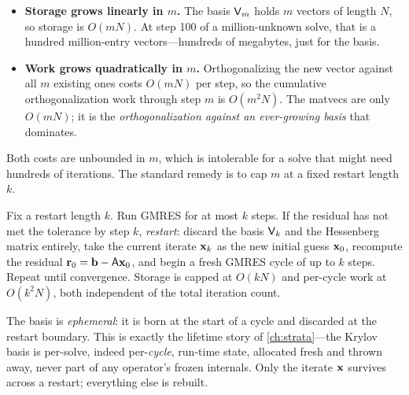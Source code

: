\begin{itemize}[nosep]
  \item \textbf{Storage grows linearly in $m$.} The basis $\mathsf{V}_m$ holds $m$
  vectors of length $N$, so storage is $O(mN)$. At step 100 of a million-unknown
  solve, that is a hundred million-entry vectors---hundreds of megabytes, just for
  the basis.
  \item \textbf{Work grows quadratically in $m$.} Orthogonalizing the new vector
  against all $m$ existing ones costs $O(mN)$ per step, so the cumulative
  orthogonalization work through step $m$ is $O(m^2N)$. The matvecs are only $O(mN)$;
  it is the \emph{orthogonalization against an ever-growing basis} that dominates.
\end{itemize}

Both costs are unbounded in $m$, which is intolerable for a solve that might need
hundreds of iterations. The standard remedy is to cap $m$ at a fixed restart length
$k$.

\begin{definition}
\label{def:restart}
Fix a restart length $k$. Run GMRES for at most $k$ steps. If the residual has not
met the tolerance by step $k$, \emph{restart}: discard the basis $\mathsf{V}_k$ and the
Hessenberg matrix entirely, take the current iterate $\mathbf{x}_k$ as the new initial guess
$\mathbf{x}_0$, recompute the residual $\mathbf{r}_0=\mathbf{b}-\mathsf{A}\mathbf{x}_0$, and begin a fresh GMRES
cycle of up to $k$ steps. Repeat until convergence. Storage is capped at $O(kN)$ and
per-cycle work at $O(k^2N)$, both independent of the total iteration count.
\end{definition}

The basis is \emph{ephemeral}: it is born at the start of a cycle and discarded at
the restart boundary. This is exactly the lifetime story of \cref{ch:strata}---the
Krylov basis is per-solve, indeed per-\emph{cycle}, run-time state, allocated fresh
and thrown away, never part of any operator's frozen internals. Only the iterate
$\mathbf{x}$ survives across a restart; everything else is rebuilt.

